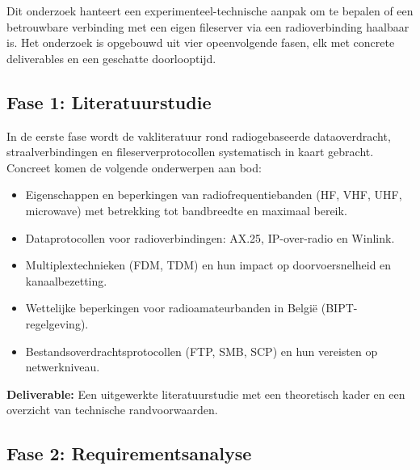 


Dit onderzoek hanteert een experimenteel-technische aanpak om te bepalen of een betrouwbare verbinding met een eigen fileserver via een radioverbinding haalbaar is. Het onderzoek is opgebouwd uit vier opeenvolgende fasen, elk met concrete deliverables en een geschatte doorlooptijd.

\subsection{Fase 1: Literatuurstudie}

In de eerste fase wordt de vakliteratuur rond radiogebaseerde dataoverdracht, straalverbindingen en fileserverprotocollen systematisch in kaart gebracht. Concreet komen de volgende onderwerpen aan bod:

\begin{itemize}
  \item Eigenschappen en beperkingen van radiofrequentiebanden (HF, VHF, UHF, microwave) met betrekking tot bandbreedte en maximaal bereik.
  \item Dataprotocollen voor radioverbindingen: AX.25, IP-over-radio en Winlink.
  \item Multiplextechnieken (FDM, TDM) en hun impact op doorvoersnelheid en kanaalbezetting.
  \item Wettelijke beperkingen voor radioamateurbanden in België (BIPT-regelgeving).
  \item Bestandsoverdrachtsprotocollen (FTP, SMB, SCP) en hun vereisten op netwerkniveau.
\end{itemize}

\textbf{Deliverable:} Een uitgewerkte literatuurstudie met een theoretisch kader en een overzicht van technische randvoorwaarden.

\subsection{Fase 2: Requirementsanalyse}

